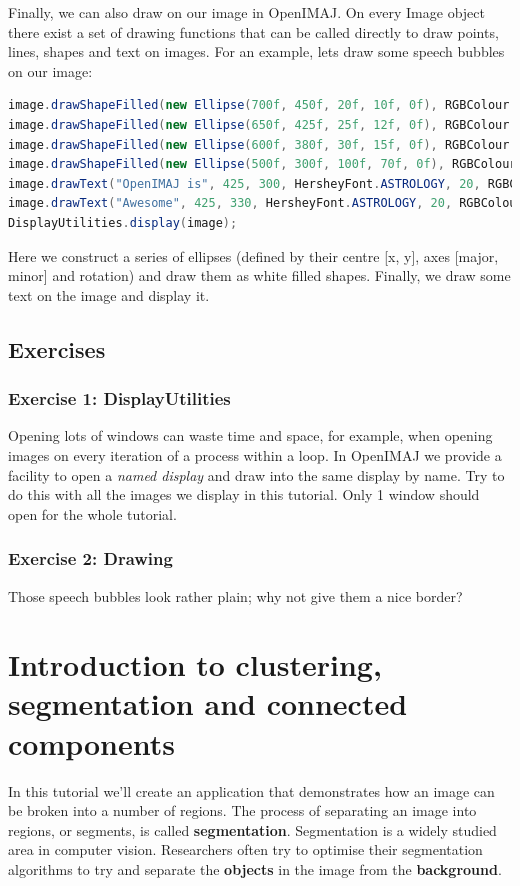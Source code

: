 \documentclass[10pt,a4paper,twoside,extrafontsizes]{memoir}
\begin{document}
Finally, we can also draw on our image in OpenIMAJ. On every Image object there exist a 
set of drawing functions that can be called directly to draw points, lines, shapes and text on 
images. For an example, lets draw some speech bubbles on our image:
\begin{lstlisting}[language=java]
image.drawShapeFilled(new Ellipse(700f, 450f, 20f, 10f, 0f), RGBColour.WHITE);
image.drawShapeFilled(new Ellipse(650f, 425f, 25f, 12f, 0f), RGBColour.WHITE);
image.drawShapeFilled(new Ellipse(600f, 380f, 30f, 15f, 0f), RGBColour.WHITE);
image.drawShapeFilled(new Ellipse(500f, 300f, 100f, 70f, 0f), RGBColour.WHITE);
image.drawText("OpenIMAJ is", 425, 300, HersheyFont.ASTROLOGY, 20, RGBColour.BLACK);
image.drawText("Awesome", 425, 330, HersheyFont.ASTROLOGY, 20, RGBColour.BLACK);
DisplayUtilities.display(image);
\end{lstlisting}
Here we construct a series of ellipses (defined by their centre [x, y], axes 
[major, minor] and rotation) and draw them as white filled shapes. Finally, we draw 
some text on the image and display it.

\section*{Exercises}
\subsection*{Exercise 1: DisplayUtilities}
Opening lots of windows can waste time and space, for example, when opening images on every 
iteration of a process within a loop. In OpenIMAJ we provide a facility to open a 
\emph{named display} and draw into the same display by name. Try to do this with all the 
images we display in this tutorial. Only 1 window should open for the whole tutorial.
\subsection*{Exercise 2: Drawing}
Those speech bubbles look rather plain; why not give them a nice border?

\chapter{Introduction to clustering, segmentation and connected components}
In this tutorial we'll create an application that demonstrates how an image can be 
broken into a number of regions. The process of separating an image into regions, 
or segments, is called \textbf{segmentation}. Segmentation is a widely studied area in 
computer vision. Researchers often try to optimise their segmentation algorithms 
to try and separate the \textbf{objects} in the image from the \textbf{background}.
\end{document}
